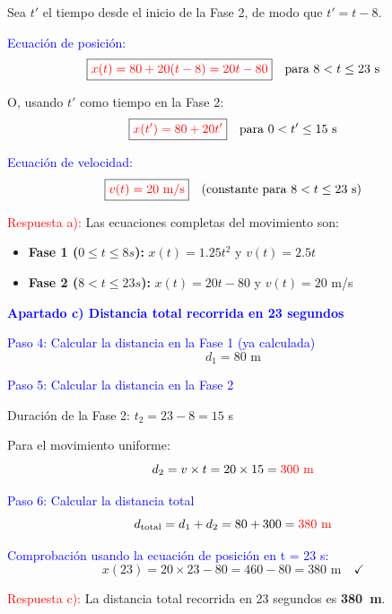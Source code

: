 \begin{exercise}
\begin{solu}
        Sea $t'$ el tiempo desde el inicio de la Fase 2, de modo que $t' = t - 8$.

        \textcolor{blue}{Ecuación de posición:}
        \[
            \boxed{\textcolor{red}{x(t) = 80 + 20(t - 8) = 20t - 80}} \quad \text{para $8 < t \leq 23$ s}
        \]

        O, usando $t'$ como tiempo en la Fase 2:
        \[
            \boxed{\textcolor{red}{x(t') = 80 + 20t'}} \quad \text{para $0 < t' \leq 15$ s}
        \]

        \textcolor{blue}{Ecuación de velocidad:}
        \[
            \boxed{\textcolor{red}{v(t) = 20 \text{ m/s}}} \quad \text{(constante para $8 < t \leq 23$ s)}
        \]

        \textcolor{red}{Respuesta a):} Las ecuaciones completas del movimiento son:
        \begin{itemize}
            \item \textbf{Fase 1 ($0 \leq t \leq 8 s$):} $x(t) = 1.25t^2$ y $v(t) = 2.5t$
            \item \textbf{Fase 2 ($8 < t \leq 23 s$):} $x(t) = 20t - 80$ y $v(t) = 20$ m/s
        \end{itemize}

        \vspace{0.5cm}

        \textbf{\textcolor{blue}{Apartado c) Distancia total recorrida en 23 segundos}}

        \textcolor{blue}{Paso 4: Calcular la distancia en la Fase 1 (ya calculada)}
        \[
            d_1 = 80 \text{ m}
        \]

        \textcolor{blue}{Paso 5: Calcular la distancia en la Fase 2}

        Duración de la Fase 2: $t_2 = 23 - 8 = 15$ s

        Para el movimiento uniforme:
        \[
            d_2 = v \times t = 20 \times 15 = \textcolor{red}{300 \text{ m}}
        \]

        \textcolor{blue}{Paso 6: Calcular la distancia total}
        \[
            d_{\text{total}} = d_1 + d_2 = 80 + 300 = \textcolor{red}{380 \text{ m}}
        \]

        \textcolor{blue}{Comprobación usando la ecuación de posición en t = 23 s:}
        \[
            x(23) = 20 \times 23 - 80 = 460 - 80 = 380 \text{ m} \quad \checkmark
        \]

        \textcolor{red}{Respuesta c):} La distancia total recorrida en 23 segundos es \textbf{\qty{380}{\m}}.


\end{solu}
\end{exercise}
